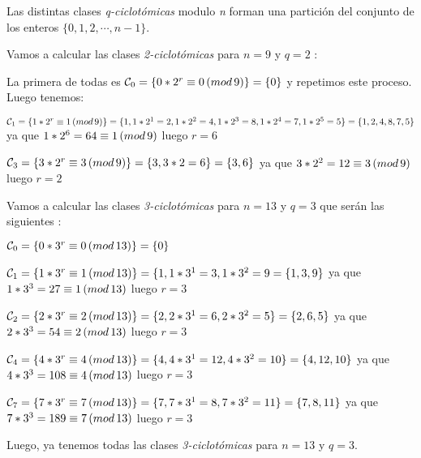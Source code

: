 Las distintas clases \textit{q-ciclotómicas} modulo \textit{n} forman una partición del conjunto de los enteros $\{0,1,2,\cdots,n-1\}$.

\begin{exampleth}
\label{ex: clase_mod_nueve}
 Vamos a calcular las clases \textit{2-ciclotómicas} para $n=9$ y $q=2$ :

La primera de todas es $\mathcal{C}_0 = \{ 0*2^r \equiv 0 \thinspace (mod \thinspace 9) \} = \{ 0 \} $ y repetimos este proceso. Luego tenemos:

$\mathcal{C}_1 = \{ 1*2^r \equiv 1 \thinspace (mod \thinspace 9) \} = \{ 1, 1*2^1=2, 1*2^2 = 4, 1*2^3 = 8, 1*2^4 = 7, 1*2^5 = 5 \} = \{1,2,4,8,7,5\} $
ya que $1*2^6 = 64 \equiv 1 \thinspace (mod \thinspace 9)$ luego $r=6$

$\mathcal{C}_3 = \{ 3*2^r \equiv 3 \thinspace (mod \thinspace 9) \} = \{ 3,3*2 = 6 \} = \{3,6 \} $ ya que $3*2^2 = 12 \equiv 3 \thinspace (mod \thinspace 9 )$ luego $r=2$

\end{exampleth}

\begin{exampleth} 
\label{ex:clase_mod_trece}
Vamos a calcular las clases \textit{3-ciclotómicas} para $n=13$ y $q=3$ que serán las siguientes :

$\mathcal{C}_0 = \{ 0*3^r \equiv 0 \thinspace (mod \thinspace 13) \} = \{ 0 \} $

$\mathcal{C}_1 = \{ 1*3^r \equiv 1 \thinspace (mod \thinspace 13) \} = \{ 1, 1*3^1=3, 1*3^2 = 9 = \{1,3,9\} $
ya que $1*3^3 = 27 \equiv 1 \thinspace (mod \thinspace 13)$ luego $r=3$

$\mathcal{C}_2 = \{ 2*3^r \equiv 2 \thinspace (mod \thinspace 13) \} = \{ 2, 2*3^1=6, 2*3^2 = 5 \} = \{2,6,5\} $
ya que $2*3^3 = 54 \equiv 2 \thinspace (mod \thinspace 13)$ luego $r=3$ 

$\mathcal{C}_4 = \{ 4*3^r \equiv 4 \thinspace (mod \thinspace 13) \} = \{ 4, 4*3^1=12, 4*3^2 = 10 \} = \{4,12,10\} $
ya que $4*3^3 = 108 \equiv 4 \thinspace (mod \thinspace 13)$ luego $r=3$

$\mathcal{C}_7 = \{ 7*3^r \equiv 7 \thinspace (mod \thinspace 13) \} = \{ 7, 7*3^1=8, 7*3^2 = 11 \} = \{7,8,11\} $
ya que $7*3^3 = 189 \equiv 7 \thinspace (mod \thinspace 13)$ luego $r=3$

Luego, ya tenemos todas las clases \textit{3-ciclotómicas} para $n=13$ y $q=3$.

\end{exampleth}



